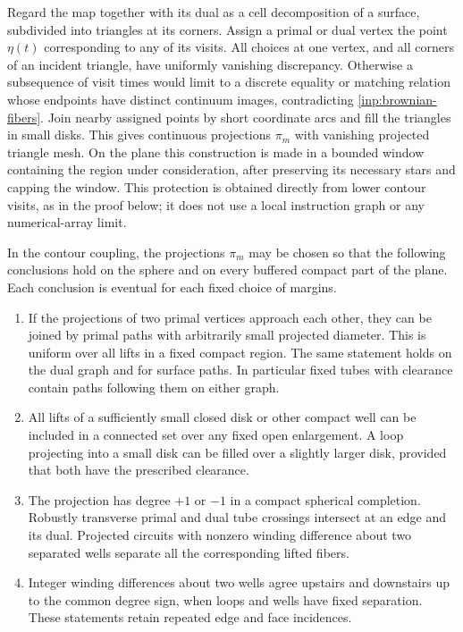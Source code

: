 Regard the map together with its dual as a cell decomposition of a
surface, subdivided into triangles at its corners.  Assign a primal or
dual vertex the point $\eta(t)$ corresponding to any of its visits.
All choices at one vertex, and all corners of an incident triangle,
have uniformly vanishing discrepancy.  Otherwise a subsequence of
visit times would limit to a discrete equality or matching relation
whose endpoints have distinct continuum images, contradicting
\eqref{inp:brownian-fibers}.  Join nearby assigned points by short
coordinate arcs and fill the triangles in small disks.  This gives
continuous projections $\pi_m$ with vanishing projected triangle mesh.
On the plane this construction is made in a bounded window containing
the region under consideration, after preserving its necessary stars
and capping the window.  This protection is obtained directly from
lower contour visits, as in the proof below; it does not use a local
instruction graph or any numerical-array limit.

\begin{proposition}\label{inp:topology}
In the contour coupling, the projections $\pi_m$ may be chosen so that
the following conclusions hold on the sphere and on every buffered
compact part of the plane.  Each conclusion is eventual for each
fixed choice of margins.
\begin{enumerate}
\item If the projections of two primal vertices approach each other,
they can be joined by primal paths with arbitrarily small projected
diameter.  This is uniform over all lifts in a fixed compact region.
The same statement holds on the dual graph and for surface paths.
In particular fixed tubes with clearance contain paths following them
on either graph.
\item All lifts of a sufficiently small closed disk or other compact
well can be included in a connected set over any fixed open
enlargement.  A loop projecting into a small disk can be filled over
a slightly larger disk, provided that both have the prescribed
clearance.
\item The projection has degree $+1$ or $-1$ in a compact spherical
completion.  Robustly transverse primal and dual tube crossings
intersect at an edge and its dual.  Projected circuits with nonzero
winding difference about two separated wells separate all the
corresponding lifted fibers.
\item Integer winding differences about two wells agree upstairs and
downstairs up to the common degree sign, when loops and wells have
fixed separation.  These statements retain repeated edge and face
incidences.
\end{enumerate}
\end{proposition}


